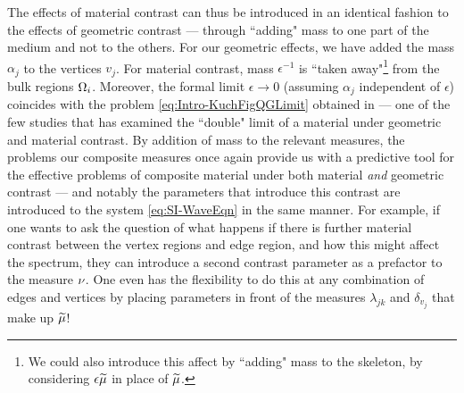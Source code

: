 The effects of material contrast can thus be introduced in an identical fashion to the effects of geometric contrast --- through ``adding" mass to one part of the medium and not to the others.
For our geometric effects, we have added the mass $\alpha_j$ to the vertices $v_j$.
For material contrast, mass $\epsilon^{-1}$ is ``taken away"\footnote{We could also introduce this affect by ``adding" mass to the skeleton, by considering $\epsilon\widetilde{\mu}$ in place of $\widetilde{\mu}$.} from the bulk regions $\Omega_i$.
Moreover, the formal limit $\epsilon\rightarrow0$ (assuming $\alpha_j$ independent of $\epsilon$) coincides with the problem \eqref{eq:Intro-KuchFigQGLimit} obtained in \cite{figotin1998spectral} --- one of the few studies that has examined the ``double" limit of a material under geometric and material contrast.
By addition of mass to the relevant measures, the problems our composite measures once again provide us with a predictive tool for the effective problems of composite material under both material \emph{and} geometric contrast --- and notably the parameters that introduce this contrast are introduced to the system \eqref{eq:SI-WaveEqn} in the same manner.
For example, if one wants to ask the question of what happens if there is further material contrast between the vertex regions and edge region, and how this might affect the spectrum, they can introduce a second contrast parameter as a prefactor to the measure $\nu$.
One even has the flexibility to do this at any combination of edges and vertices by placing parameters in front of the measures $\lambda_{jk}$ and $\delta_{v_j}$ that make up $\widetilde{\mu}$!

